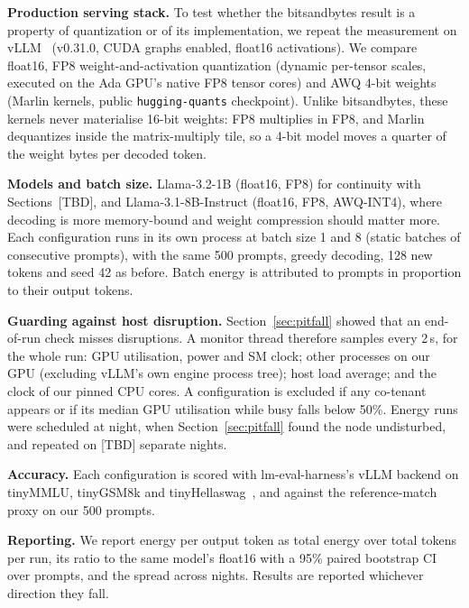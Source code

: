 
\textbf{Production serving stack.} To test whether the bitsandbytes result is a property of quantization or of its implementation, we repeat the measurement on vLLM~\cite{kwon2023vllm} (v0.31.0, CUDA graphs enabled, float16 activations). We compare float16, FP8 weight-and-activation quantization (dynamic per-tensor scales, executed on the Ada GPU's native FP8 tensor cores) and AWQ 4-bit weights~\cite{lin2024awq} (Marlin kernels, public \texttt{hugging-quants} checkpoint). Unlike bitsandbytes, these kernels never materialise 16-bit weights: FP8 multiplies in FP8, and Marlin dequantizes inside the matrix-multiply tile, so a 4-bit model moves a quarter of the weight bytes per decoded token.

\textbf{Models and batch size.} Llama-3.2-1B (float16, FP8) for continuity with Sections~[TBD], and Llama-3.1-8B-Instruct (float16, FP8, AWQ-INT4), where decoding is more memory-bound and weight compression should matter more. Each configuration runs in its own process at batch size 1 and 8 (static batches of consecutive prompts), with the same 500 prompts, greedy decoding, 128 new tokens and seed 42 as before. Batch energy is attributed to prompts in proportion to their output tokens.

\textbf{Guarding against host disruption.} Section~\ref{sec:pitfall} showed that an end-of-run check misses disruptions. A monitor thread therefore samples every 2\,s, for the whole run: GPU utilisation, power and SM clock; other processes on our GPU (excluding vLLM's own engine process tree); host load average; and the clock of our pinned CPU cores. A configuration is excluded if any co-tenant appears or if its median GPU utilisation while busy falls below 50\%. Energy runs were scheduled at night, when Section~\ref{sec:pitfall} found the node undisturbed, and repeated on [TBD] separate nights.

\textbf{Accuracy.} Each configuration is scored with lm-eval-harness's vLLM backend on tinyMMLU, tinyGSM8k and tinyHellaswag~\cite{polo2024tiny}, and against the reference-match proxy on our 500 prompts.

\textbf{Reporting.} We report energy per output token as total energy over total tokens per run, its ratio to the same model's float16 with a 95\% paired bootstrap CI over prompts, and the spread across nights. Results are reported whichever direction they fall.
